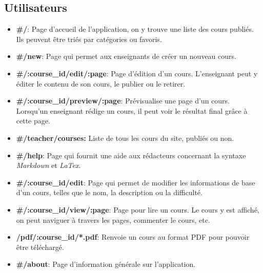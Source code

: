 \documentclass[a4paper,10pt,twoside]{sphinxmanual}
\begin{document}
\subsection{Utilisateurs}
\label{guide:utilisateurs}\begin{itemize}
\item {} 
\textbf{\#/}: Page d'accueil de l'application, on y trouve une liste des cours publiés. Ils peuvent être triés par catégories ou favoris.

\item {} 
\textbf{\#/new}: Page qui permet aux enseignants de créer un nouveau cours.

\item {} 
\textbf{\#/:course\_id/edit/:page}: Page d'édition d'un cours. L'enseignant peut y éditer le contenu de son cours, le publier ou le retirer.

\item {} 
\textbf{\#/:course\_id/preview/:page}: Prévisualise une page d'un cours. Lorsqu'un enseignant rédige un cours, il peut voir le résultat final grâce à cette page.

\item {} 
\textbf{\#/teacher/courses:} Liste de tous les cours du site, publiés ou non.

\item {} 
\textbf{\#/help}: Page qui fournit une aide aux rédacteurs concernant la syntaxe \emph{Markdown} et \emph{LaTex}.

\item {} 
\textbf{\#/:course\_id/edit}: Page qui permet de modifier les informations de base d'un cours, telles que le nom, la description ou la difficulté.

\item {} 
\textbf{\#/:course\_id/view/:page}: Page pour lire un cours. Le cours y est affiché, on peut naviguer à travers les pages, commenter le cours, etc.

\item {} 
\textbf{/pdf/:course\_id/*.pdf}: Renvoie un cours au format PDF pour pouvoir être téléchargé.

\item {} 
\textbf{\#/about}: Page d'information générale sur l'application.

\end{itemize}
\end{document}
